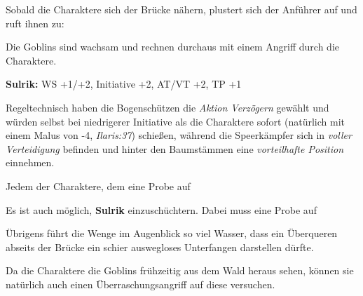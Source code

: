 Sobald die Charaktere sich der Brücke nähern, plustert sich der Anführer auf und ruft ihnen zu:

Die Goblins sind wachsam und rechnen durchaus mit einem Angriff durch die Charaktere.

\kreaturgoblin
\textbf{Sulrik:} WS +1/+2, Initiative +2, AT/VT +2, TP +1



Regeltechnisch haben die Bogenschützen die \emph{Aktion Verzögern} gewählt und würden selbst bei niedrigerer Initiative als die Charaktere sofort (natürlich mit einem Malus von -4, \textit{Ilaris:37}) schießen, während die Speerkämpfer sich in \textit{voller Verteidigung} befinden und hinter den Baumstämmen eine \emph{vorteilhafte Position} einnehmen.


Jedem der Charaktere, dem eine Probe auf 


Es ist auch möglich, \textbf{Sulrik} einzuschüchtern. Dabei muss eine Probe auf


Übrigens führt die Wenge im Augenblick so viel Wasser, dass ein Überqueren abseits der Brücke ein schier auswegloses Unterfangen darstellen dürfte. 

Da die Charaktere die Goblins frühzeitig aus dem Wald heraus sehen, können sie natürlich auch einen Überraschungsangriff auf diese versuchen.



